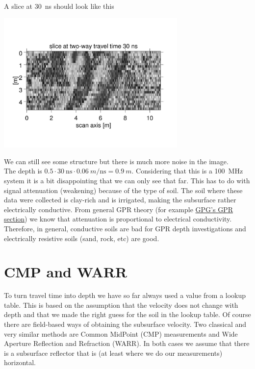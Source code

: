 \documentclass[11pt]{article}
\begin{document}
A slice at \SI{30}{ns} should look like this
\begin{center}
\includegraphics[width=0.7\textwidth, trim = 1cm 3cm 1cm
  3cm,clip]{figures/Area30ns.jpg}
\end{center}

We can still see some structure but there is much more noise in the
image.  \\The depth is $0.5 \cdot \SI{30}{\ns} \cdot \SI{0.06}{m\per\ns}
= \SI{0.9}{m}$.  Considering that this is a \SI{100}{\MHz} system it is a bit
disappointing that we can only see that far. This has to do with
signal attenuation (weakening) because of the type of soil.  The soil
where these data were collected is clay-rich and is irrigated, making
the subsurface rather electrically conductive.  From general GPR
theory (for example
\href{http://gpg.geosci.xyz/content/GPR/GPR_physical_properties.html}{GPG's
  GPR section}) we know that attenuation is proportional to electrical
conductivity. Therefore, in general, conductive soils are bad for GPR
depth investigations and electrically resistive soils (sand, rock,
etc) are good.


\section{CMP and WARR}

To turn travel time into depth we have so far always used a value from
a lookup table. This is based on the assumption that the velocity does
not change with depth and that we made the right guess for the soil in
the lookup table. Of course there are field-based ways of obtaining
the subsurface velocity. Two classical and very similar methods are
Common MidPoint (CMP) measurements and Wide Aperture Reflection and
Refraction (WARR). In both cases we assume that there is a subsurface
reflector that is (at least where we do our measurements) horizontal.
\end{document}
